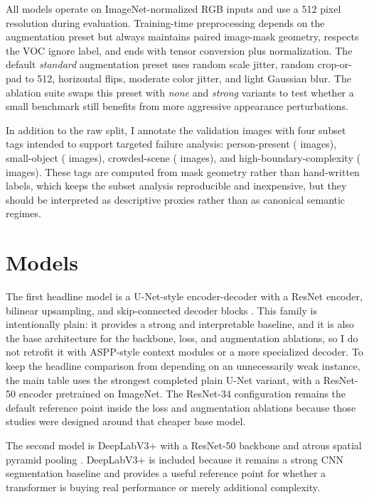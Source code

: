 \documentclass{article}
\begin{document}
All models operate on ImageNet-normalized RGB inputs and use a \num{512} pixel resolution during evaluation. Training-time preprocessing depends on the augmentation preset but always maintains paired image-mask geometry, respects the VOC ignore label, and ends with tensor conversion plus normalization. The default \emph{standard} augmentation preset uses random scale jitter, random crop-or-pad to \num{512}, horizontal flips, moderate color jitter, and light Gaussian blur. The ablation suite swaps this preset with \emph{none} and \emph{strong} variants to test whether a small benchmark still benefits from more aggressive appearance perturbations.

In addition to the raw split, I annotate the validation images with four subset tags intended to support targeted failure analysis: person-present (\PersonCount{} images), small-object (\SmallObjectCount{} images), crowded-scene (\CrowdedCount{} images), and high-boundary-complexity (\BoundaryCount{} images). These tags are computed from mask geometry rather than hand-written labels, which keeps the subset analysis reproducible and inexpensive, but they should be interpreted as descriptive proxies rather than as canonical semantic regimes.

\section{Models}

The first headline model is a U-Net-style encoder-decoder with a ResNet encoder, bilinear upsampling, and skip-connected decoder blocks \citep{ronneberger2015u,he2016deep}. This family is intentionally plain: it provides a strong and interpretable baseline, and it is also the base architecture for the backbone, loss, and augmentation ablations, so I do not retrofit it with ASPP-style context modules or a more specialized decoder. To keep the headline comparison from depending on an unnecessarily weak instance, the main table uses the strongest completed plain U-Net variant, with a ResNet-50 encoder pretrained on ImageNet. The ResNet-34 configuration remains the default reference point inside the loss and augmentation ablations because those studies were designed around that cheaper base model.

The second model is DeepLabV3+ with a ResNet-50 backbone and atrous spatial pyramid pooling \citep{chen2018encoder}. DeepLabV3+ is included because it remains a strong CNN segmentation baseline and provides a useful reference point for whether a transformer is buying real performance or merely additional complexity.
\end{document}
